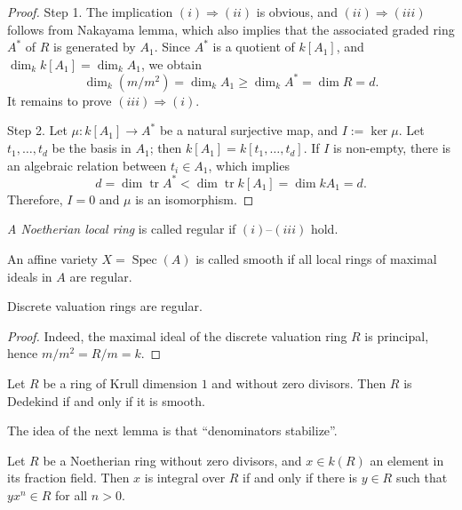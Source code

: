 \begin{proof}
Step 1. The implication $(i)\Rightarrow(ii)$
is obvious, and $(ii)\Rightarrow(iii)$
follows from Nakayama lemma, which also
implies that the associated graded ring
$A^\ast$ of $R$ is generated by $A_1$.
Since $A^\ast$ is a quotient of
$k[A_1]$, and
$\dim_k k[A_1]=\dim_k A_1$, we obtain
$$
\dim_k(m/m^2)
=\dim_k A_1
\geq \dim_k A^\ast
=\dim R
=d.
$$
It remains to prove
$(iii)\Rightarrow(i)$.

Step 2. Let
$\mu:k[A_1]\to A^\ast$ be a natural
surjective map, and $I:=\ker \mu$.
Let $t_1,\dots,t_d$ be the basis in $A_1$;
then $k[A_1]=k[t_1,\dots,t_d]$.
If $I$ is non-empty, there is an algebraic
relation between $t_i\in A_1$, which implies
$$
d=\dim \operatorname{tr} A^\ast<
\dim \operatorname{tr} k[A_1]
=\dim kA_1=d.
$$
Therefore, $I=0$ and $\mu$ is an
isomorphism.
\end{proof}

\begin{definition}
\label{definition-regular-ring}
{\it A Noetherian local ring} is called
regular if $(i)$--$(iii)$ hold.
\end{definition}

\begin{definition}
\label{definition-smooth-affine-variety}
An affine variety $X=\operatorname{Spec}(A)$
is called smooth if all local rings of
maximal ideals in $A$ are regular.
\end{definition}

\begin{lemma}
\label{lemma-dvr-regular}
Discrete valuation rings are regular.
\end{lemma}

\begin{proof}
Indeed, the maximal ideal of the discrete
valuation ring $R$ is principal, hence
$m/m^2=R/m=k$.
\end{proof}

\begin{corollary}
\label{lemma-dim-1-dedekind-smooth}
Let $R$ be a ring of Krull dimension $1$
and without zero divisors. Then $R$ is
Dedekind if and only if it is smooth.
\end{corollary}

\noindent
The idea of the next lemma is that
``denominators stabilize''.

\begin{lemma}
\label{lemma-integral-over-fraction-field}
Let $R$ be a Noetherian ring without zero
divisors, and $x\in k(R)$ an element in its
fraction field. Then $x$ is integral over
$R$ if and only if there is $y\in R$ such
that $yx^n\in R$ for all $n>0$.
\end{lemma}

